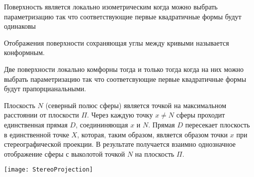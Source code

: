\begin{theorem}
  Поверхность является локально изометрическим когда можно выбрать
  параметризацию так что соответствующие первые квадратичные формы будут
  одинаковы
\end{theorem}

\begin{define}
  Отображения поверхности сохраняющая углы между кривыми называется
  конформным.
\end{define}

\begin{theorem}
  Две поверхности локально комфорны тогда и только тогда когда на них можно
  выбрать параметризацию так что соответсвующие первые квадратичные формы будут
  прапорцианальными.
\end{theorem}

\begin{define}
  Плоскость $N$ (северный полюс сферы) является точкой на максимальном
  расстоянии от плоскости $\Pi$. Через каждую точку $x \not= N$ сферы проходит
  единственная прямая $D$, соедининяющая $x$ и $N$. Прямая $D$ пересекает
  плоскость в единственной точке $X$, которая, таким образом, является образом
  точки $x$ при стереографической проекции. В результате получается взаимно
  однозначное отображение сферы с выколотой точкой $N$ на плоскость $\Pi$.

  \texttt{[image: StereoProjection]}
\end{define}

